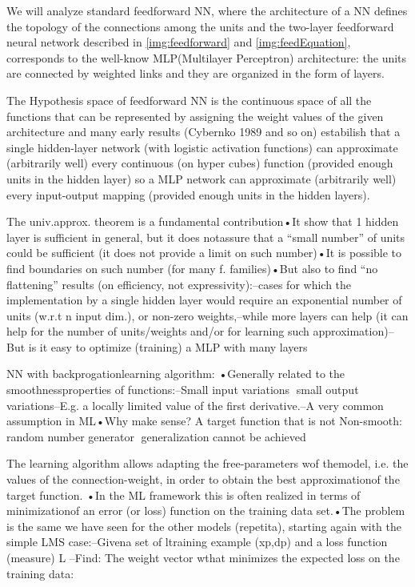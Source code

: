 We will analyze standard feedforward NN, where the architecture of a NN defines the topology of the connections among the units and the two-layer feedforward neural network 
described in \ref{img:feedforward} and \ref{img:feedEquation}, corresponds to the well-know MLP(Multilayer Perceptron) architecture: the units are connected by weighted links 
and they are organized in the form of layers. 

The Hypothesis space of feedforward NN is the continuous space of all the functions that can be represented by assigning the weight values of the given architecture and many early results
(Cybernko 1989 and so on) estabilish that a single hidden-layer network (with logistic activation functions) can approximate (arbitrarily well) every continuous (on hyper cubes) function
(provided enough units in the hidden layer) so a MLP network can approximate (arbitrarily well) every input-output mapping (provided enough units in the hidden layers).

The univ.approx. theorem is a fundamental contribution•It show that 1 hidden layer is sufficient in general, but it does notassure that a “small number” of units could be sufficient (it does not provide a limit on such number)•It is possible to find boundaries on such number (for many f. families)•But also to find “no flattening” results (on efficiency, not expressivity):–cases for which the implementation by a single hidden layer would require an exponential number of units (w.r.t n input dim.), or non-zero weights,–while more layers can help (it can help for the number of units/weights and/or for learning such approximation)–But is it easy to optimize (training) a MLP with many layers

NN with backprogationlearning algorithm: •Generally related to the smoothnessproperties of functions:–Small input variations small output variations–E.g. a locally limited value of the first derivative.–A very common assumption in ML•Why make sense? A target function that is not Non-smooth: random number generator generalization cannot be achieved

The learning algorithm allows adapting the free-parameters wof themodel, i.e. the values of the connection-weight, in order to obtain the best approximationof the target function. •In the ML framework this is often realized in terms of minimizationof an error (or loss) function on the training data set.•The problem is the same we have seen for the other models (repetita), starting again with the simple LMS case:–Givena set of ltraining example  (xp,dp)  and a loss function (measure) L –Find: The weight vector wthat minimizes the expected loss on the training data:

